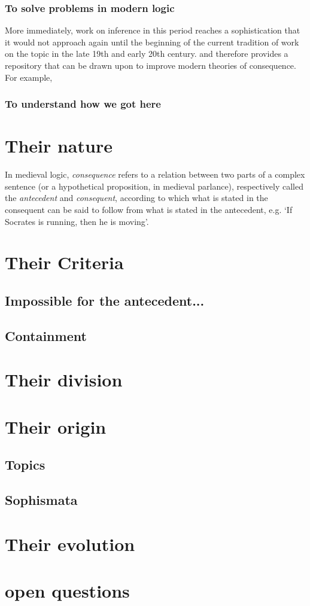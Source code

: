 \documentclass[]{article}
\begin{document}
\subsubsection{To solve problems in modern logic}
More immediately, work on inference in this period reaches a sophistication that it would not approach again until the beginning of the current tradition of work on the topic in the late 19th and early 20th century. and therefore provides a repository that can be drawn upon to improve modern theories of consequence. For example, 

\subsubsection{To understand how we got here}
\section{Their nature}
In medieval logic, \emph{consequence} refers to a relation between two parts of a complex sentence (or a hypothetical proposition, in medieval parlance), respectively called the \emph{antecedent} and \emph{consequent}, according to which what is stated in the consequent can be said to follow from what is stated in the antecedent, e.g. `If Socrates is running, then he is moving'. 
\section{Their Criteria}
\subsection{Impossible for the antecedent...}
\subsection{Containment}
\section{Their division}
\section{Their origin}
\subsection{Topics}
\subsection{Sophismata}
\section{Their evolution}
\section{open questions}
\end{document}
